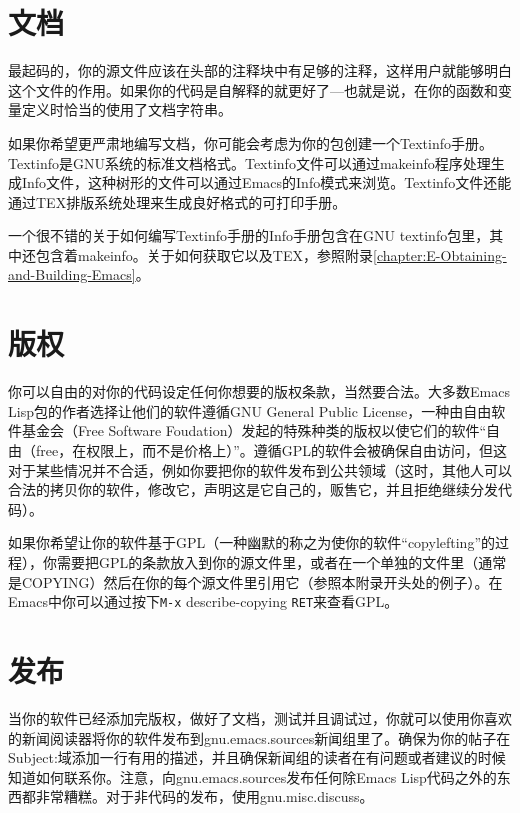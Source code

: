 \section{文档}
\label{section:D-Documentation}

最起码的，你的源文件应该在头部的注释块中有足够的注释，这样用户就能够明白这个文件的作用。如果你的代码是自解释的就更好了---也就是说，在你的函数和变量定义时恰当的使用了文档字符串。

如果你希望更严肃地编写文档，你可能会考虑为你的包创建一个Textinfo手册。Textinfo是GNU系统的标准文档格式。Textinfo文件可以通过makeinfo程序处理生成Info文件，这种树形的文件可以通过Emacs的Info模式来浏览。Textinfo文件还能通过TEX排版系统处理来生成良好格式的可打印手册。

一个很不错的关于如何编写Textinfo手册的Info手册包含在GNU textinfo包里，其中还包含着makeinfo。关于如何获取它以及TEX，参照附录\ref{chapter:E-Obtaining-and-Building-Emacs}。

\section{版权}
\label{section:D-Copyright}

你可以自由的对你的代码设定任何你想要的版权条款，当然要合法。大多数Emacs Lisp包的作者选择让他们的软件遵循GNU General Public License，一种由自由软件基金会（Free Software Foudation）发起的特殊种类的版权以使它们的软件“自由（free，在权限上，而不是价格上）”。遵循GPL的软件会被确保自由访问，但这对于某些情况并不合适，例如你要把你的软件发布到公共领域（这时，其他人可以合法的拷贝你的软件，修改它，声明这是它自己的，贩售它，并且拒绝继续分发代码）。

如果你希望让你的软件基于GPL（一种幽默的称之为使你的软件“copylefting”的过程），你需要把GPL的条款放入到你的源文件里，或者在一个单独的文件里（通常是COPYING）然后在你的每个源文件里引用它（参照本附录开头处的例子）。在Emacs中你可以通过按下\verb|M-x| describe-copying \verb|RET|来查看GPL。

\section{发布}
\label{section:D-Posting}

当你的软件已经添加完版权，做好了文档，测试并且调试过，你就可以使用你喜欢的新闻阅读器将你的软件发布到gnu.emacs.sources新闻组里了。确保为你的帖子在Subject:域添加一行有用的描述，并且确保新闻组的读者在有问题或者建议的时候知道如何联系你。注意，向gnu.emacs.sources发布任何除Emacs Lisp代码之外的东西都非常糟糕。对于非代码的发布，使用gnu.misc.discuss。
